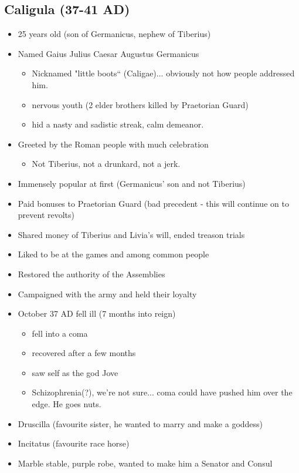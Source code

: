\documentclass[12pt, twoside]{article}
\begin{document}
\subsection{Caligula (37-41 AD)}
\begin{itemize}
\item 25 years old (son of Germanicus, nephew of Tiberius)
\item Named Gaius Julius Caesar Augustus Germanicus
	\begin{itemize}
	\item Nicknamed "little boots“ (Caligae)... obviously not how people addressed him.
	\item nervous youth (2 elder brothers killed by Praetorian Guard)
	\item hid a nasty and sadistic streak, calm demeanor.
	\end{itemize}
\item Greeted by the Roman people with much celebration
	\begin{itemize}
	\item Not Tiberius, not a drunkard, not a jerk.
	\end{itemize}
\item Immensely popular at first (Germanicus’ son and not Tiberius)
\item Paid bonuses to Praetorian Guard (bad precedent - this will continue on to prevent revolts)
\item Shared money of Tiberius and Livia’s will, ended treason trials
\item Liked to be at the games and among common people
\item Restored the authority of the Assemblies
\item Campaigned with the army and held their loyalty
\item October 37 AD fell ill (7 months into reign)
	\begin{itemize}
	\item fell into a coma
	\item recovered after a few months
	\item saw self as the god Jove
	\item Schizophrenia(?), we're not sure... coma could have pushed him over the edge.  He goes nuts.
	\end{itemize}
\item Druscilla (favourite sister, he wanted to marry and make a goddess)
\item Incitatus (favourite race horse)
\item Marble stable, purple robe, wanted to make him a Senator and Consul

\end{itemize}
\end{document}
